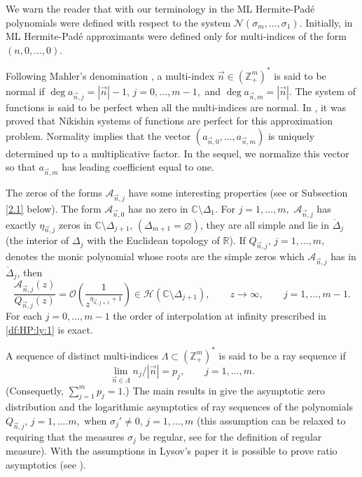 \documentclass{amsart}
\numberwithin{equation}{section}
\theoremstyle{definition}
\newcommand{\ZZ}{\mathbb{Z}}      %
\newcommand{\RR}{\mathbb{R}}      %
\newcommand{\CC}{\mathbb{C}}      %
\newcommand{\n}{\vec{n}}          %
\begin{document}
    We warn the reader that with our terminology in \cite[Problem A]{lysov20} the ML Hermite-Padé polynomials were defined with respect to the system $\mathcal{N}(\sigma_m,\ldots,\sigma_1)$. Initially, in \cite{LSJ19} ML Hermite-Pad\'e approximants were defined only for multi-indices of the form $(n,0,\ldots,0)$.

    Following Mahler's denomination \cite{mahler}, a multi-index $\n \in (\ZZ_+^m)^*$ is said to be normal if $\deg a_{{\n},j} = |\n| -1$, $j=0,\ldots,m-1,$ and $\deg a_{{\n},m} = |\n|$. The system of functions is said to be perfect when all the multi-indices are normal. In \cite[Theorem 1.1]{lysov20}, it was proved that Nikishin systems of functions are perfect for this approximation problem. Normality implies that the vector $(a_{\n,0},\ldots,a_{\n,m})$ is uniquely determined up to a multiplicative factor. In the sequel, we normalize this vector so that $a_{\n,m}$ has leading coefficient equal to one.

    The zeros of the forms $\mathcal{A}_{\n,j}$ have some interesting properties (see \cite[Lemma 2.2]{SLL22} or Subsection \ref{2.1} below). The form $\mathcal{A}_{\vec n,0}$ has no zero in $\CC \setminus \Delta_1$. For $j=1,\ldots, m,$ $\mathcal{A}_{\vec n,j}$ has exactly $\eta_{\n,j}$ zeros in $\CC \setminus \Delta_{j+1}$, $(\Delta_{m+1} = \varnothing )$, they are all simple and lie in $\mathring{\Delta}_j$ (the interior of $\Delta_j$ with the Euclidean topology of $\RR$). If $Q_{\vec n,j}$, $j= 1,\ldots,m,$ denotes the monic  polynomial whose roots are the simple zeros which $\mathcal{A}_{\vec n,j}$ has in $\mathring{\Delta}_j$, then
    \[
       	\frac{\mathcal{A}_{\n,j}(z)}{Q_{\n,j}(z)} = \mathcal{O}\left(\frac{1}{z^{\eta_{\n,j+1}+1}}\right) \in \mathcal{H}(\CC \setminus\Delta_{j+1}), \qquad z\to \infty, \qquad j=1,\ldots,m-1.
    \]
    For each $j = 0,\ldots,m-1$ the order of interpolation at infinity prescribed in \eqref{df:HP:ly:1} is exact.

    A sequence of distinct multi-indices $\Lambda \subset (\ZZ_+^m)^*$ is said to be a ray sequence if
    \[
        \lim_{\n \in \Lambda} n_j/|\n| = p_j, \qquad j=1,\ldots,m.
    \]
    (Consequetly, $\sum_{j=1}^m p_j= 1$.)
    The main results in \cite[Theorem 1.2, Corollary 1.1]{lysov20} give the asymptotic zero distribution and the logarithmic asymptotics of ray sequences of the polynomials $Q_{\n,j}$, $j=1,\ldots.m,$ when $\sigma_j' \neq 0$, $j=1,\ldots,m$ (this assumption can be relaxed to requiring that the measures $\sigma_j$ be regular, see \cite[Chap. 3]{Stahl_Totik} for the definition of regular measure). With the assumptions in Lysov's paper it is possible to prove ratio asymptotics (see \cite[Theorem 3.4, Corollary 3.5]{SLL22}).
\end{document}
